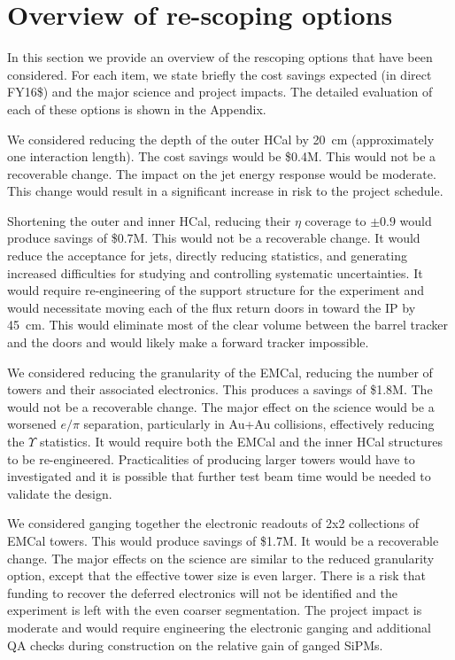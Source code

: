 
\section{Overview of re-scoping options}
\label{sec:overview-re-scoping}

In this section we provide an overview of the rescoping options that
have been considered.  For each item, we state briefly the cost
savings expected (in direct FY16\$) and the major science and project
impacts.  The detailed evaluation of each of these options is shown in
the Appendix.

We considered reducing the depth of the outer HCal by 20~cm
(approximately one interaction length).  The cost savings would be
\$0.4M.  This would not be a recoverable change. The impact on the jet
energy response would be moderate.  This change would result in a
significant increase in risk to the project schedule.

Shortening the outer and inner HCal, reducing their $\eta$ coverage to
$\pm0.9$ would produce savings of \$0.7M.  This would not be a
recoverable change.  It would reduce the acceptance for jets, directly
reducing statistics, and generating increased difficulties for
studying and controlling systematic uncertainties.  It would require
re-engineering of the support structure for the experiment and would
necessitate moving each of the flux return doors in toward the IP by
45~cm.  This would eliminate most of the clear volume between the
barrel tracker and the doors and would likely make a forward tracker
impossible.

We considered reducing the granularity of the EMCal, reducing the
number of towers and their associated electronics.  This produces a
savings of \$1.8M.  The would not be a recoverable change.  The major
effect on the science would be a worsened $e/\pi$ separation,
particularly in Au+Au collisions, effectively reducing the $\Upsilon$
statistics.  It would require both the EMCal and the inner HCal
structures to be re-engineered.  Practicalities of producing larger towers
would have to investigated and it is possible that further test beam
time would be needed to validate the design.

We considered ganging together the electronic readouts of 2x2
collections of EMCal towers. This would produce savings of \$1.7M.  It
would be a recoverable change.  The major effects on the science are
similar to the reduced granularity option, except that the effective
tower size is even larger.  There is a risk that funding to recover
the deferred electronics will not be identified and the experiment is
left with the even coarser segmentation.  The project impact is
moderate and would require engineering the electronic ganging and
additional QA checks during construction on the relative gain of
ganged SiPMs. 

